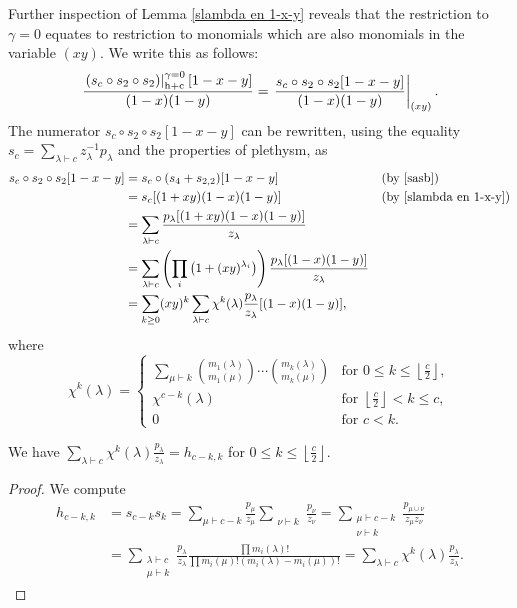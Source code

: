 \documentclass[twoside]{article}
\renewcommand{\hcZ}[1]{\left.\left(#1\right)\right|_{\textnormal{h+c}}^{\gamma=0}}
\begin{document}
Further inspection of Lemma \ref{slambda en 1-x-y} reveals that the restriction to $\gamma=0$ equates to restriction to monomials which are also monomials in the variable $(xy)$. We write this as follows:
\begin{equation}\label{eq:1}
\frac{\hcZ{s_c\circ s_2\circ s_2} [1-x-y]}{(1-x)(1-y)} = \left.\frac{s_c\circ s_2\circ s_2[1-x-y]}{(1-x)(1-y)}\right|_{(xy)}.
\end{equation}
The numerator $s_c\circ s_2\circ s_2[1-x-y]$ can be rewritten, using the equality $s_c = \sum_{\lambda\vdash c} z_\lambda^{-1} p_\lambda$ and the properties of plethysm, as
\begin{align*}
    s_c\circ s_2\circ s_2[1-x-y] 
    & = s_c \circ (s_4 + s_{2,2})[1-x-y] 
    && \text{(by \ref{sasb})}\\
    & = s_c [(1+xy)(1-x)(1-y)] 
    && \text{(by \ref{slambda en 1-x-y})}\\
    &= \sum_{\lambda\vdash c} \frac{p_\lambda[(1+xy)(1-x)(1-y)]}{z_\lambda} \\
    &= \sum_{\lambda\vdash c} \left(\prod_i\left( 1+(xy)^{\lambda_i}\right)\right)
    \frac{p_\lambda[(1-x)(1-y)]}{z_\lambda} \\
    &= \sum_{k\ge0} (xy)^k\sum_{\lambda\vdash c} \chi^k(\lambda)\frac{p_\lambda}{z_\lambda}[(1-x)(1-y)],
\end{align*}
where 
\[
    \chi^k(\lambda) =
    \begin{cases}
        \sum_{\mu\vdash k}\binom{m_1(\lambda)}{m_1(\mu)}\cdots\binom{m_k(\lambda)}{m_k(\mu)} & \text{for } 0\le k\le \left\lfloor \frac{c}{2}\right\rfloor,\\
        \chi^{c-k}(\lambda) & \text{for } \left\lfloor \frac{c}{2}\right\rfloor< k\le c,\\
        0 &\text{for } c<k.
    \end{cases}
\]

\begin{lem}
We have $\sum\limits_{\lambda\vdash c} \chi^k(\lambda)\frac{p_\lambda}{z_\lambda} = h_{c-k,k}$ for $0\le k\le \left\lfloor\frac{c}{2}\right\rfloor$.
\end{lem}
\begin{proof}
We compute
\begin{align*}
    h_{c-k, k}
    &= s_{c-k}s_k = \sum_{\mu\vdash c-k}\frac{p_{\mu}}{z_\mu}\sum_{\substack{\nu\vdash k}} \frac{p_{\nu}}{z_\nu} = \sum_{\substack{\mu\vdash c-k\\\nu\vdash k}} \frac{p_{\mu\cup\nu}}{z_\mu z_\nu}\\
    &= \sum_{\substack{\lambda\vdash c\\\mu\vdash k}}\frac{p_\lambda}{z_\lambda}\frac{\prod m_i(\lambda)!}{\prod m_i(\mu)! (m_i(\lambda)-m_i(\mu))!} = \sum_{\lambda\vdash c}\chi^k(\lambda)\frac{p_\lambda}{z_\lambda}.
\end{align*}
\end{proof}
\end{document}
